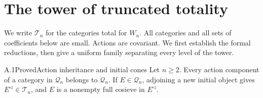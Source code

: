 \section{The tower of truncated totality}

We write $\mathcal T_n$ for the categories total for $W_n$. All categories and all sets of coefficients below are small. Actions are covariant. We first establish the formal reductions, then give a uniform family separating every level of the tower.

\begin{claim}{A.1}{Proved}{Action inheritance and initial cones}\label{A:cone}
Let $n\geq2$. Every action component of a category in $\mathcal Q_n$ belongs to $\mathcal Q_n$. If $E\in\mathcal Q_n$, adjoining a new initial object gives $E^{\triangleleft}\in\mathcal T_n$, and $E$ is a nonempty full cosieve in $E^{\triangleleft}$.
\end{claim}
